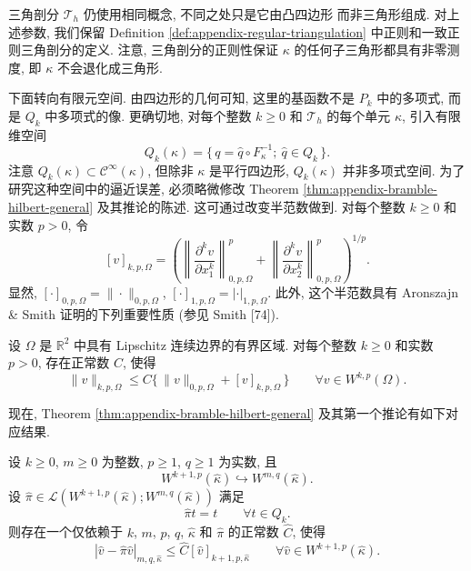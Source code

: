 三角剖分 $\mathcal{T}_h$ 仍使用相同概念, 不同之处只是它由凸四边形
而非三角形组成. 对上述参数, 我们保留 Definition
\ref{def:appendix-regular-triangulation} 中正则和一致正则三角剖分的定义.
注意, 三角剖分的正则性保证 $\kappa$ 的任何子三角形都具有非零测度,
即 $\kappa$ 不会退化成三角形.

下面转向有限元空间. 由四边形的几何可知,
这里的基函数不是 $P_k$ 中的多项式, 而是 $Q_k$ 中多项式的像.
更确切地, 对每个整数 $k\geq0$ 和 $\mathcal{T}_h$ 的每个单元
$\kappa$, 引入有限维空间
\begin{equation}\label{eq:appendix-quadrilateral-local-space}
Q_k(\kappa)
=
\{\,q=\hat q\circ F_\kappa^{-1};\ \hat q\in Q_k\,\}.
\end{equation}
注意 $Q_k(\kappa)\subset\mathcal{C}^\infty(\kappa)$,
但除非 $\kappa$ 是平行四边形, $Q_k(\kappa)$ 并非多项式空间.
为了研究这种空间中的逼近误差, 必须略微修改 Theorem
\ref{thm:appendix-bramble-hilbert-general} 及其推论的陈述.
这可通过改变半范数做到. 对每个整数 $k\geq0$ 和实数 $p>0$, 令
\begin{equation}\label{eq:appendix-directional-seminorm}
[v]_{k,p,\Omega}
=
\left(
\left\|\frac{\partial^kv}{\partial x_1^k}\right\|_{0,p,\Omega}^p
+
\left\|\frac{\partial^kv}{\partial x_2^k}\right\|_{0,p,\Omega}^p
\right)^{1/p}.
\end{equation}
显然,
$[\cdot]_{0,p,\Omega}=\|\cdot\|_{0,p,\Omega}$,
$[\cdot]_{1,p,\Omega}=|\cdot|_{1,p,\Omega}$.
此外, 这个半范数具有 Aronszajn \& Smith 证明的下列重要性质
(参见 Smith [74]).

\setcounter{statement}{7}
\begin{Lemma}\label{lem:appendix-directional-seminorm-equivalence}
设 $\Omega$ 是 $\mathbb{R}^2$ 中具有 Lipschitz 连续边界的有界区域.
对每个整数 $k\geq0$ 和实数 $p>0$, 存在正常数 $C$, 使得
\begin{equation}\label{eq:appendix-directional-seminorm-equivalence}
\|v\|_{k,p,\Omega}
\leq
C\{\,\|v\|_{0,p,\Omega}+[v]_{k,p,\Omega}\,\}
\qquad
\forall v\in W^{k,p}(\Omega).
\end{equation}
\end{Lemma}

现在, Theorem \ref{thm:appendix-bramble-hilbert-general}
及其第一个推论有如下对应结果.

\setcounter{statement}{2}
\begin{Theorem}\label{thm:appendix-quadrilateral-bramble-hilbert}
设 $k\geq0$, $m\geq0$ 为整数, $p\geq1$, $q\geq1$ 为实数, 且
\[
W^{k+1,p}(\hat\kappa)\hookrightarrow W^{m,q}(\hat\kappa).
\]
设
$\hat\pi\in\mathcal{L}(W^{k+1,p}(\hat\kappa);W^{m,q}(\hat\kappa))$
满足
\[
\hat\pi t=t
\qquad
\forall t\in Q_k.
\]
则存在一个仅依赖于 $k$, $m$, $p$, $q$, $\hat\kappa$ 和 $\hat\pi$
的正常数 $\hat C$, 使得
\begin{equation}\label{eq:appendix-quadrilateral-bramble-hilbert}
|\hat v-\hat\pi\hat v|_{m,q,\hat\kappa}
\leq
\hat C[\hat v]_{k+1,p,\hat\kappa}
\qquad
\forall\hat v\in W^{k+1,p}(\hat\kappa).
\end{equation}
\end{Theorem}

